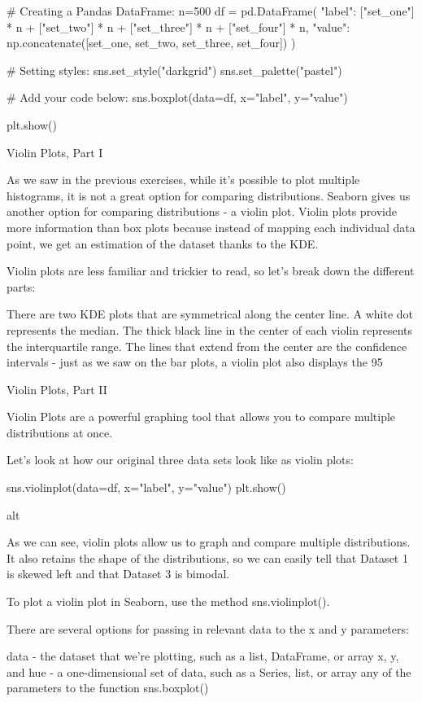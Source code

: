 \documentclass{journal}
\begin{document}
# Creating a Pandas DataFrame:
n=500
df = pd.DataFrame({
    "label": ["set_one"] * n + ["set_two"] * n + ["set_three"] * n + ["set_four"] * n,
    "value": np.concatenate([set_one, set_two, set_three, set_four])
})

# Setting styles:
sns.set_style("darkgrid")
sns.set_palette("pastel")

# Add your code below:
sns.boxplot(data=df, x="label", y="value")

plt.show()


Violin Plots, Part I

As we saw in the previous exercises, while it’s possible to plot multiple histograms, it is not a great option for comparing distributions. Seaborn gives us another option for comparing distributions - a violin plot. Violin plots provide more information than box plots because instead of mapping each individual data point, we get an estimation of the dataset thanks to the KDE.

Violin plots are less familiar and trickier to read, so let’s break down the different parts:

    There are two KDE plots that are symmetrical along the center line.
    A white dot represents the median.
    The thick black line in the center of each violin represents the interquartile range.
    The lines that extend from the center are the confidence intervals - just as we saw on the bar plots, a violin plot also displays the 95%

Violin Plots, Part II

Violin Plots are a powerful graphing tool that allows you to compare multiple distributions at once.

Let’s look at how our original three data sets look like as violin plots:

sns.violinplot(data=df, x="label", y="value")
plt.show()

alt

As we can see, violin plots allow us to graph and compare multiple distributions. It also retains the shape of the distributions, so we can easily tell that Dataset 1 is skewed left and that Dataset 3 is bimodal.

To plot a violin plot in Seaborn, use the method sns.violinplot().

There are several options for passing in relevant data to the x and y parameters:

    data - the dataset that we’re plotting, such as a list, DataFrame, or array
    x, y, and hue - a one-dimensional set of data, such as a Series, list, or array
    any of the parameters to the function sns.boxplot()
\end{document}
